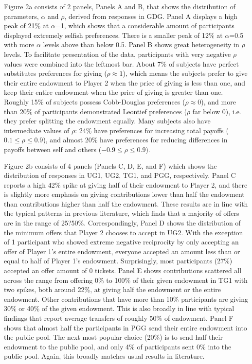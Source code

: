 \documentclass[12pt]{article}
\begin{document}
{\color{green}Figure 2a} consists of 2 panels, Panels A and B, that shows the distribution of parameters, \(\alpha\) and \(\rho\), derived from responses in GDG.  Panel A displays a high peak of 21\% at \(\alpha\)=1, which shows that a considerable amount of participants displayed extremely selfish preferences. There is a smaller peak of 12\% at \(\alpha\)=0.5 with more \(\alpha\) levels above than below 0.5. Panel B shows great heterogeneity in \(\rho\) levels. To facilitate presentation of the data, participants with very negative \(\rho\) values were combined into the leftmost bar. About 7\% of subjects have perfect substitutes preferences for giving (\(\rho \approx 1\)), which means the subjects prefer to give their entire endowment to Player 2 when the price of giving is less than one, and keep their entire endowment when the price of giving is greater than one. Roughly 15\% of subjects possess Cobb-Douglas preferences (\(\rho \approx 0\)), and more than 20\% of participants demonstrated Leontief preferences (\(\rho\) far below 0), i.e. they prefer splitting the endowment equally. Many subjects also have intermediate values of \(\rho\): 24\% have preferences for increasing total payoffs (\(0.1 \leq \rho \leq 0.9\)), and almost 20\% have preferences for reducing differences in payoffs between self and others (\(-0.9 \leq \rho \leq 0.9\)).


{\color{green}Figure 2b} consists of 4 panels (Panels C, D, E, and F) which shows the distribution of responses in UG1, UG2, TG1, and PGG, respectively. Panel C reports a high 42\% spike at giving half of their endowment to Player 2, and there is slightly more emphasis on giving contributions lower than half the endowment than contributions higher than half the endowment. These results are in line with the typical patterns in previous literature, which finds that a majority of offers are in the range of 25?50\%. Correspondingly, Panel D shows the distribution of the minimum offers that Player 2 chooses to accept in UG2. With the exception of 1 participant who showed extreme negative reciprocity by only accepting an offer of Player 1's entire endowment, everyone accepted an amount less than or equal to half of Player 1's endowment. Surprisingly, most participants (27\%) accepted an offer amount of 0 tickets. Panel E shows contributions scattered all across the range from offering 0\% to 100\% of their given endowment in TG1 with two spikes, both around 22\%, at giving half the endowment or the entire endowment. Other contributions that have more than 10\% participants are giving 30\% or 40\% of the given endowment. This is also broadly in line with typical findings that report average transfers of roughly 50\% of endowment. Panel F shows that almost half the participants in PGG send their entire endowment into the public pool. The next most popular choice (20\%) is to send half their endowment to the public pool, and only 4\% of participants sent 0\% into the public pool. Again, this broadly matches usual results in literature.
\end{document}
